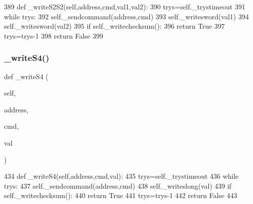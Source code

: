 \begin{DoxyCode}
389     \textcolor{keyword}{def }\_writeS2S2(self,address,cmd,val1,val2):
390         trys=self.\_trystimeout
391         \textcolor{keywordflow}{while} trys:
392             self.\_sendcommand(address,cmd)
393             self.\_writesword(val1)
394             self.\_writesword(val2)
395             \textcolor{keywordflow}{if} self.\_writechecksum():
396                 \textcolor{keywordflow}{return} \textcolor{keyword}{True}
397             trys=trys-1
398         \textcolor{keywordflow}{return} \textcolor{keyword}{False}
399 
\end{DoxyCode}
\mbox{\label{classtoxic__hardware_1_1roboclaw__3_1_1Roboclaw_a34b9b9300afab1efbbc42d181c56d4b7}} 
\subsubsection{\texorpdfstring{\+\_\+write\+S4()}{\_writeS4()}}
{\footnotesize\ttfamily def \+\_\+write\+S4 (\begin{DoxyParamCaption}\item[{}]{self,  }\item[{}]{address,  }\item[{}]{cmd,  }\item[{}]{val }\end{DoxyParamCaption})\hspace{0.3cm}{\ttfamily [private]}}


\begin{DoxyCode}
434     \textcolor{keyword}{def }\_writeS4(self,address,cmd,val):
435         trys=self.\_trystimeout
436         \textcolor{keywordflow}{while} trys:
437             self.\_sendcommand(address,cmd)
438             self.\_writeslong(val)
439             \textcolor{keywordflow}{if} self.\_writechecksum():
440                 \textcolor{keywordflow}{return} \textcolor{keyword}{True}
441             trys=trys-1
442         \textcolor{keywordflow}{return} \textcolor{keyword}{False}
443 
\end{DoxyCode}
\mbox{\label{classtoxic__hardware_1_1roboclaw__3_1_1Roboclaw_ad31595fb54ad1158569552405f74a6cf}} 

